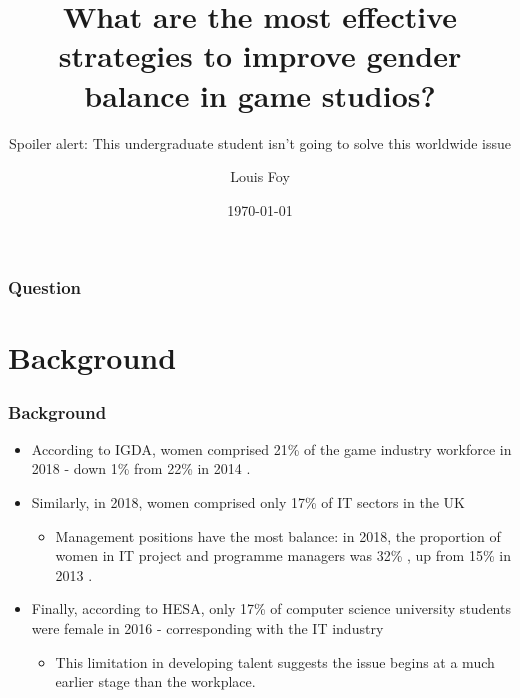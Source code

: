 \documentclass{beamer}
\title{What are the most effective strategies to improve gender balance in game studios?}
\subtitle{Spoiler alert: This undergraduate student isn't going to solve this worldwide issue}
\author{Louis Foy}
\institute{Falmouth University}
\date{\today}
\begin{document}
\begin{frame}
	\titlepage
\end{frame}

\begin{frame}
	\frametitle{Question}
	\tableofcontents
\end{frame}

\section{Background}
\begin{frame}
	\frametitle{Background}
	\begin{itemize}
	    \item According to IGDA, women comprised 21\% of the game industry workforce in 2018 \cite{igda_satisfaction_2017} - down 1\% from 22\% in 2014 \cite{igda_satisfaction_2014}.
	    \item Similarly, in 2018, women comprised only 17\% of IT sectors in the UK \cite{uk_employees_2018} %
	    \begin{itemize}
	        \item Management positions have the most balance: in 2018, the proportion of women in IT project and programme managers was 32\% \cite{uk_employees_2018}, up from 15\% in 2013 \cite{uk_employees_2013}.
	    \end{itemize}
	    \item Finally, according to HESA, only 17\% of computer science university students were female in 2016 \cite{hesa_2016} - corresponding with the IT industry
	    \begin{itemize}
	        \item This limitation in developing talent suggests the issue begins at a much earlier stage than the workplace.
	    \end{itemize}
	\end{itemize}
\end{frame}
\end{document}
